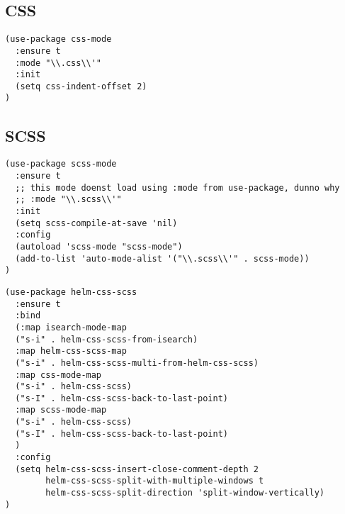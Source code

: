 \documentclass[11pt]{article}
\begin{document}
\subsection*{CSS}
\label{sec:org4d775e2}

\begin{verbatim}
(use-package css-mode
  :ensure t
  :mode "\\.css\\'"
  :init
  (setq css-indent-offset 2)
)
\end{verbatim}

\subsection*{SCSS}
\label{sec:org71f54ac}
\begin{verbatim}
(use-package scss-mode
  :ensure t
  ;; this mode doenst load using :mode from use-package, dunno why
  ;; :mode "\\.scss\\'"
  :init
  (setq scss-compile-at-save 'nil)
  :config
  (autoload 'scss-mode "scss-mode")
  (add-to-list 'auto-mode-alist '("\\.scss\\'" . scss-mode))
)
\end{verbatim}

\begin{verbatim}
(use-package helm-css-scss
  :ensure t
  :bind
  (:map isearch-mode-map
  ("s-i" . helm-css-scss-from-isearch)
  :map helm-css-scss-map
  ("s-i" . helm-css-scss-multi-from-helm-css-scss)
  :map css-mode-map
  ("s-i" . helm-css-scss)
  ("s-I" . helm-css-scss-back-to-last-point)
  :map scss-mode-map
  ("s-i" . helm-css-scss)
  ("s-I" . helm-css-scss-back-to-last-point)
  )
  :config
  (setq helm-css-scss-insert-close-comment-depth 2
        helm-css-scss-split-with-multiple-windows t
        helm-css-scss-split-direction 'split-window-vertically)
)
\end{verbatim}
\end{document}

